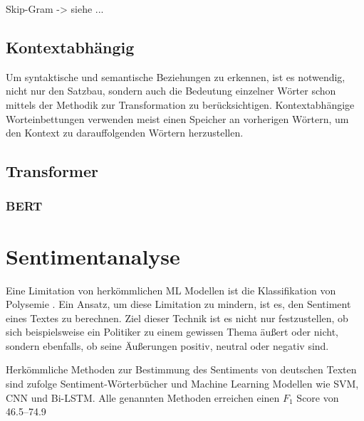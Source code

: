 Skip-Gram -> siehe ...

\subsection{Kontextabhängig}

Um syntaktische und semantische Beziehungen zu erkennen, ist es notwendig, nicht nur den Satzbau, sondern auch die Bedeutung einzelner Wörter schon mittels der Methodik zur Transformation zu berücksichtigen. Kontextabhängige Worteinbettungen verwenden meist einen Speicher an vorherigen Wörtern, um den Kontext zu darauffolgenden Wörtern herzustellen.





\subsection{Transformer}


\subsubsection*{BERT}


\section{Sentimentanalyse} \label{sec:sentimentanalysis}

Eine Limitation von herkömmlichen \ac{ML} Modellen ist die Klassifikation von Polysemie \autocite[48\psq]{kowsari_text_2019}. Ein Ansatz, um diese Limitation zu mindern, ist es, den Sentiment eines Textes zu berechnen. Ziel dieser Technik ist es nicht nur festzustellen, ob sich beispielsweise ein Politiker zu einem gewissen Thema äußert oder nicht, sondern ebenfalls, ob seine Äußerungen positiv, neutral oder negativ sind.

Herkömmliche Methoden zur Bestimmung des Sentiments von deutschen Texten sind \textcite[1627\psq]{guhr_training_2020} zufolge Sentiment-Wörterbücher und Machine Learning Modellen wie \ac{SVM}, \ac{CNN} und \ac{Bi-LSTM}. Alle genannten Methoden erreichen einen $F_1$ Score von \numrange{46.5}{74.9}

